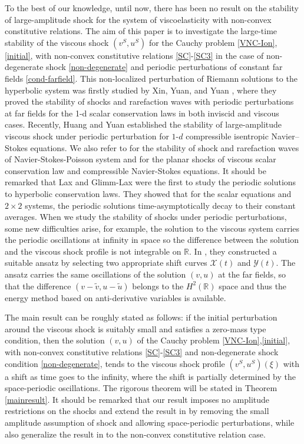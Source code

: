 \documentclass[12pt,reqno]{amsart}
\numberwithin{equation}{section}
\def\R{\mathbb{R}}
\def\X{\mathcal{X}}
\def\Y{\mathcal{Y}}
\begin{document}
To the best of our knowledge, until now, there has been no result on the stability of large-amplitude shock for the system of viscoelasticity with non-convex constitutive relations. The aim of this paper is to investigate the large-time stability of the viscous shock $(v^S,u^S)$ for the Cauchy problem  \eqref{VNC-Ion},\eqref{initial}, with non-convex constitutive relations \eqref{SC}-\eqref{SC3} in the case of non-degenerate shock \eqref{non-degenerate} and periodic perturbations of constant far fields \eqref{cond-farfield}. This non-localized perturbation of Riemann solutions to the hyperbolic system was firstly studied by Xin, Yuan, and Yuan \cite{Xin.2019,Xin.2021,Yuan.2020}, where they proved the stability of shocks and rarefaction waves with periodic perturbations at far fields for the 1-d scalar conservation laws in both inviscid and viscous cases. Recently, Huang and Yuan \cite{HuangYuanCMP} established the stability of large-amplitude viscous shock under
periodic perturbation for $1$-$d$ compressible isentropic Navier–Stokes
equations. We also refer to \cite{MeiYuan2025} for the stability of shock and rarefaction waves of Navier-Stokes-Poisson system and \cite{YuanSiam,YuanSCM2025} for the planar shocks of viscous scalar conservation law and compressible Navier-Stokes equations. It should be remarked that Lax \cite{Lax1} and
Glimm-Lax \cite{Lax2} were the first to study the periodic solutions to hyperbolic conservation laws. They showed that for the scalar equations and $2\times2$ systems, the periodic solutions time-asymptotically decay to their constant averages. When we study the stability of shocks under periodic perturbations, some new difficulties arise, for example, the solution to the viscous system carries the periodic oscillations at infinity in space so the difference between the solution and the viscous shock profile is not integrable on $\R$. In \cite{Xin.2019,Xin.2021,Yuan.2020,HuangYuanCMP,MeiYuan2025}, they constructed a suitable ansatz by selecting two appropriate shift curves $\X(t)$ and $\Y(t)$. The ansatz carries the same oscillations of the solution $(v,u)$
at the far fields, so that the difference $(v-\tilde v,u-\tilde u)$ belongs to the $H^2(\R)$ space and thus the energy method based on anti-derivative variables is available. 

 The main result can be roughly stated as follows: if the initial perturbation around the viscous shock is suitably small and satisfies a zero-mass type condition, then the solution $(v,u)$ of the Cauchy problem \eqref{VNC-Ion},\eqref{initial}, with non-convex constitutive relations \eqref{SC}-\eqref{SC3} and non-degenerate shock condition  \eqref{non-degenerate}, tends to the viscous shock profile $(v^S,u^S)(\xi)$ with a shift as time goes to the infinity, where the shift is partially determined by the space-periodic oscillations. The rigorous theorem will be stated in Theorem \ref{mainresult}. It should be remarked that our result imposes no amplitude restrictions on the shocks and extend the result in \cite{InitialModel,Gaijin} by removing the small amplitude assumption of shock and allowing space-periodic perturbations, while also generalize the result in \cite{HuangYuanCMP} to the non-convex constitutive relation case.
\end{document}
